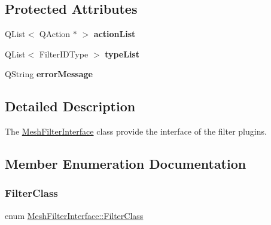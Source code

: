 \subsection*{Protected Attributes}
\begin{DoxyCompactItemize}
\item 
\mbox{\label{class_mesh_filter_interface_a6be72583d983a34c82d5072ded2bbf8d}} 
Q\+List$<$ Q\+Action $\ast$ $>$ {\bfseries action\+List}
\item 
\mbox{\label{class_mesh_filter_interface_ad902bbee202cf558a53f852a3f0fac56}} 
Q\+List$<$ Filter\+I\+D\+Type $>$ {\bfseries type\+List}
\item 
\mbox{\label{class_mesh_filter_interface_a0bbe74d2d346623e3c513548b714254b}} 
Q\+String {\bfseries error\+Message}
\end{DoxyCompactItemize}


\subsection{Detailed Description}
The \hyperlink{class_mesh_filter_interface}{Mesh\+Filter\+Interface} class provide the interface of the filter plugins. 

\subsection{Member Enumeration Documentation}
\mbox{\label{class_mesh_filter_interface_a67a90dc6ac04fafd04e7cb8c38d0e20f}} 
\subsubsection{\texorpdfstring{Filter\+Class}{FilterClass}}
{\footnotesize\ttfamily enum \hyperlink{class_mesh_filter_interface_a67a90dc6ac04fafd04e7cb8c38d0e20f}{Mesh\+Filter\+Interface\+::\+Filter\+Class}}

